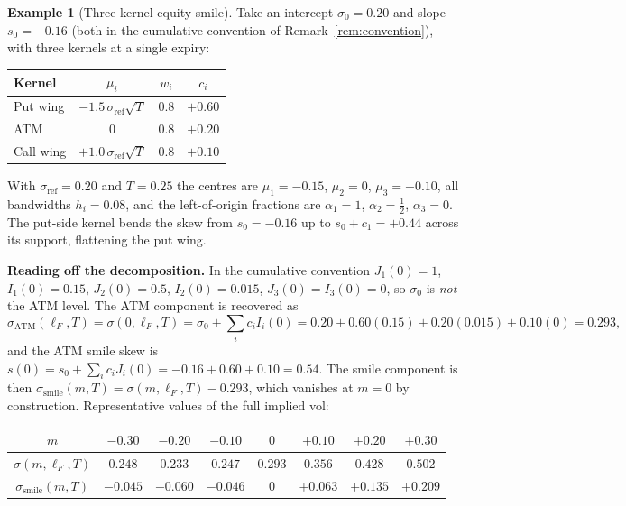 \documentclass[11pt]{book}
\theoremstyle{plain}
\theoremstyle{definition}
\newtheorem{example}[theorem]{Example}
\theoremstyle{remark}
\newcommand{\mln}{m}                             %
\newcommand{\lF}{\ell_F}                         %
\newcommand{\ssm}{\sigma_{\mathrm{smile}}}       %
\newcommand{\satm}{\sigma_{\mathrm{ATM}}}        %
\newcommand{\sref}{\sigma_{\mathrm{ref}}}        %
\begin{document}
\begin{example}[Three-kernel equity smile]\label{ex:three-kernel}
Take an intercept $\sigma_0 = 0.20$ and slope $s_0 = -0.16$ (both in the
cumulative convention of Remark~\ref{rem:convention}), with three kernels at a
single expiry:

\medskip
\begin{center}
\begin{tabular}{lccc}
\toprule
Kernel & $\mu_i$ & $w_i$ & $c_i$ \\
\midrule
Put wing  & $-1.5\,\sref\sqrt{T}$ & $0.8$ & $+0.60$ \\
ATM       & $0$                    & $0.8$ & $+0.20$ \\
Call wing & $+1.0\,\sref\sqrt{T}$  & $0.8$ & $+0.10$ \\
\bottomrule
\end{tabular}
\end{center}
\medskip

\noindent With $\sref = 0.20$ and $T = 0.25$ the centres are $\mu_1 = -0.15$,
$\mu_2 = 0$, $\mu_3 = +0.10$, all bandwidths $h_i = 0.08$, and the left-of-origin
fractions are $\alpha_1 = 1$, $\alpha_2 = \tfrac12$, $\alpha_3 = 0$. The put-side
kernel bends the skew from $s_0 = -0.16$ up to $s_0 + c_1 = +0.44$ across its
support, flattening the put wing.

\medskip
\noindent\textbf{Reading off the decomposition.} In the cumulative convention
$J_1(0)=1$, $I_1(0)=0.15$, $J_2(0)=0.5$, $I_2(0)=0.015$, $J_3(0)=I_3(0)=0$, so
$\sigma_0$ is \emph{not} the ATM level. The ATM component is recovered as
\[
\satm(\lF,T) = \sigma(0,\lF,T)
= \sigma_0 + \sum_i c_i I_i(0)
= 0.20 + 0.60(0.15) + 0.20(0.015) + 0.10(0) = 0.293,
\]
and the ATM smile skew is
$s(0) = s_0 + \sum_i c_i J_i(0) = -0.16 + 0.60 + 0.10 = 0.54$. The smile
component is then $\ssm(\mln,T) = \sigma(\mln,\lF,T) - 0.293$, which vanishes at
$\mln=0$ by construction. Representative values of the full implied vol:

\medskip
\begin{center}
\begin{tabular}{cccccccc}
\toprule
$\mln$ & $-0.30$ & $-0.20$ & $-0.10$ & $0$ & $+0.10$ & $+0.20$ & $+0.30$ \\
\midrule
$\sigma(\mln,\lF,T)$ & $0.248$ & $0.233$ & $0.247$ & $0.293$ & $0.356$ & $0.428$ & $0.502$ \\
$\ssm(\mln,T)$ & $-0.045$ & $-0.060$ & $-0.046$ & $0$ & $+0.063$ & $+0.135$ & $+0.209$ \\
\bottomrule
\end{tabular}
\end{center}
\medskip


\end{example}
\end{document}
